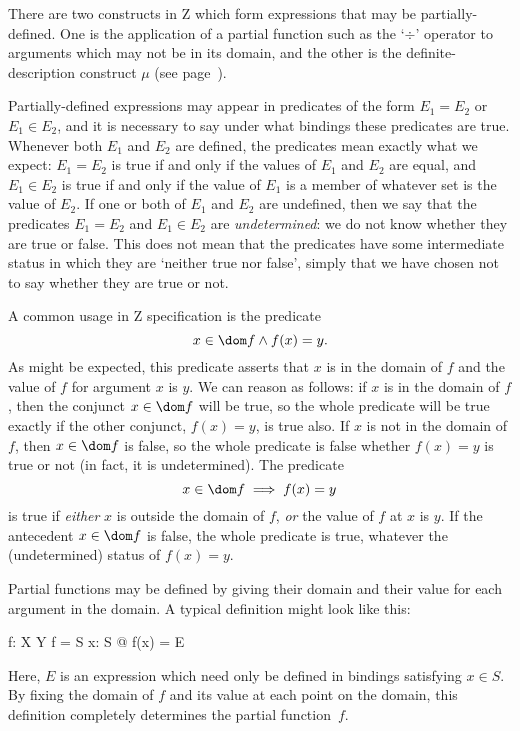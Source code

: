 There are two constructs in Z which form expressions that may be
partially-defined.  One is the application of a partial function
such as the `$\div$' operator to arguments which may not be in its
domain, and the other is the definite-description construct $\mu$
(see page~\pageref{p:lambdamu}).

\new Partially-defined expressions may appear in predicates of the
form $E_1 = E_2$ or $E_1 \in E_2$, and it is necessary to say under
what bindings these predicates are true.  Whenever both $E_1$ and
$E_2$ are defined, the predicates mean exactly what we expect: $E_1
= E_2$ is true if and only if the values of $E_1$ and $E_2$ are equal,
and $E_1 \in E_2$ is true if and only if the value of $E_1$ is a
member of whatever set is the value of $E_2$.  If one or both of
$E_1$ and $E_2$ are undefined, then we say that the predicates $E_1
= E_2$ and $E_1 \in E_2$ are {\em undetermined}:  we do not know
whether they are true or false.  This does not mean that the
predicates have some intermediate status in which they are `neither
true nor false', simply that we have chosen not to say whether they
are true or not.

A common usage in Z specification is the predicate
\[ x \in \dom f \land f(x) = y. \]
As might be expected, this predicate asserts that $x$ is in the domain
of $f$ and the value of $f$ for argument $x$ is $y$. We can reason as
follows: if $x$ is in the domain of $f$, then the conjunct $x \in
\dom f$ will be true, so the whole predicate will be true exactly if
the other conjunct, $f(x) = y$, is true also. If $x$ is not in the
domain of $f$, then $x \in \dom f$ is false, so the whole predicate is
false whether $f(x) = y$ is true or not (in fact, it is undetermined).
The predicate
\[ x \in \dom f \implies f(x) = y \]
is true if {\em either\/} $x$ is outside the domain of $f$, {\em or\/}
the value of $f$ at $x$ is $y$. If the antecedent $x \in \dom f$ is
false, the whole predicate is true, whatever the (undetermined) status
of $f(x) = y$.

Partial functions may be defined by giving their domain and their
value for each argument in the domain. A typical definition might look
like this:
\begin{axdef}
	f: X \pfun Y
\where
	\dom f = S
\also
	\forall x: S @ f(x) = E
\end{axdef}
Here, $E$ is an expression which need only be defined in bindings
satisfying $x \in S$. By fixing the domain of $f$ and its value at
each point on the domain, this definition completely determines the
partial function~$f$.

